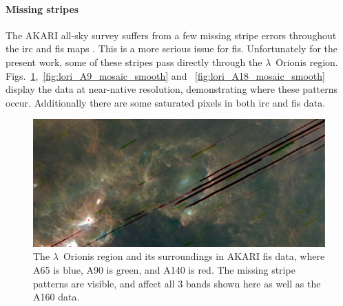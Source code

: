         \paragraph{Missing stripes}
          The AKARI all-sky survey suffers from a few missing stripe errors throughout the \gls{irc} and \gls{fis} maps \citep{ishihara10, doi15}. This is a more serious issue for \gls{fis}. Unfortunately for the present work, some of these stripes pass directly through the $\lambda$~Orionis region. Figs.~\ref{fig:LOri_FIS_color},~\ref{fig:lori_A9_mosaic_smooth} and ~\ref{fig:lori_A18_mosaic_smooth} display the data at near-native resolution, demonstrating where these patterns occur. Additionally there are some saturated pixels in both \gls{irc} and \gls{fis} data.
            \begin{figure}
              \includegraphics[width=\textwidth]{../Plots/ch_lori/lori_fis_rgb.pdf}
              \centering
              \caption{The $\lambda$~Orionis region and its surroundings in AKARI \gls{fis} data, where A65 is blue, A90 is green, and A140 is red. The missing stripe patterns are visible, and affect all 3 bands shown here as well as the A160 data. }
              \label{fig:LOri_FIS_color}
            \end{figure}
